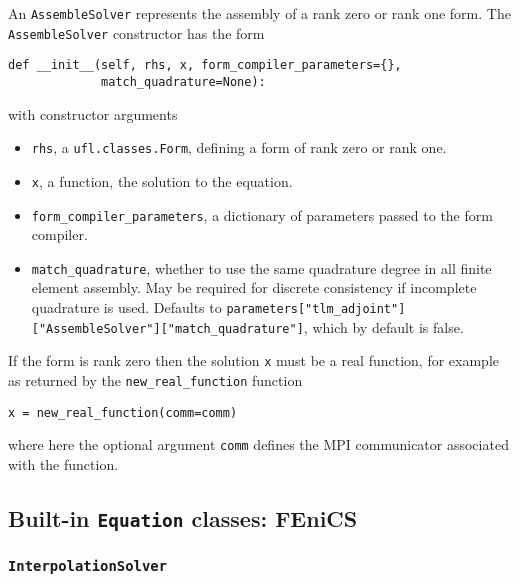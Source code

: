 \documentclass[11pt]{article}
\begin{document}
An \texttt{AssembleSolver} represents the assembly of a rank zero or rank one
form. The \texttt{AssembleSolver} constructor has the form
\begin{lstlisting}
def __init__(self, rhs, x, form_compiler_parameters={},
             match_quadrature=None):
\end{lstlisting}
with constructor arguments
\begin{itemize}
  \item \texttt{rhs}, a \texttt{ufl.classes.Form}, defining a form of rank zero
    or rank one.
  \item \texttt{x}, a function, the solution to the equation.
  \item \texttt{form\_compiler\_parameters}, a dictionary of parameters passed
    to the form compiler.
  \item \texttt{match\_quadrature}, whether to use the same quadrature degree
    in all finite element assembly. May be required for discrete consistency if
    incomplete quadrature is used. Defaults to
    \texttt{parameters["tlm\_adjoint"]}\texttt{["AssembleSolver"]}\texttt{["match\_quadrature"]},
    which by default is false.
\end{itemize}

If the form is rank zero then the solution \texttt{x} must be a real function,
for example as returned by the \texttt{new\_real\_function} function
\begin{lstlisting}
x = new_real_function(comm=comm)
\end{lstlisting}
where here the optional argument \texttt{comm} defines the MPI communicator
associated with the function.

\subsection{Built-in \texttt{Equation} classes: FEniCS}

\subsubsection{\texttt{InterpolationSolver}}\label{sect:InterpolationSolver}
\end{document}
